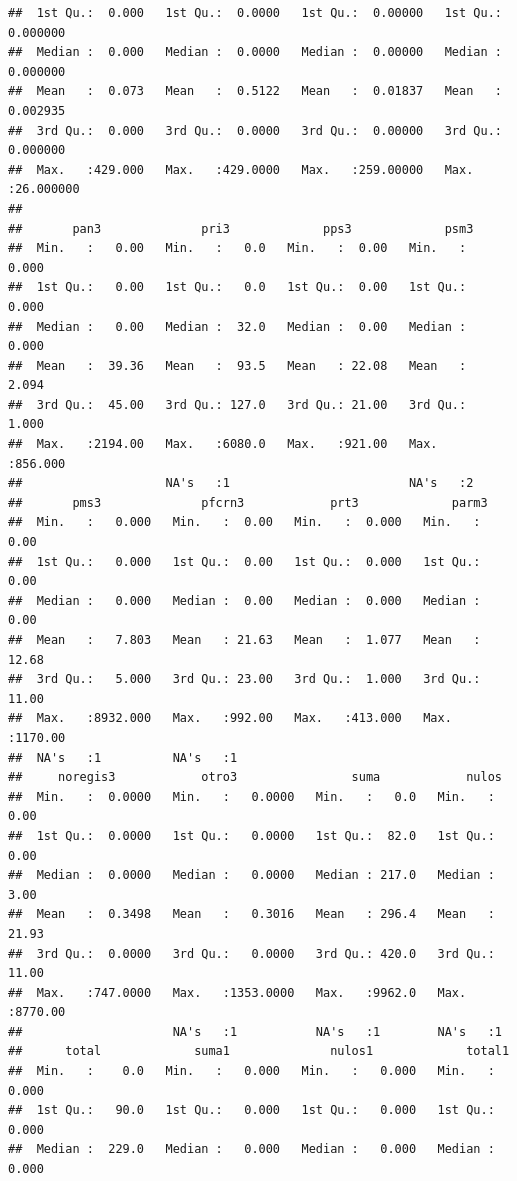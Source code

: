 \documentclass[
]{article}
\begin{document}
\begin{verbatim}
##  1st Qu.:  0.000   1st Qu.:  0.0000   1st Qu.:  0.00000   1st Qu.: 0.000000  
##  Median :  0.000   Median :  0.0000   Median :  0.00000   Median : 0.000000  
##  Mean   :  0.073   Mean   :  0.5122   Mean   :  0.01837   Mean   : 0.002935  
##  3rd Qu.:  0.000   3rd Qu.:  0.0000   3rd Qu.:  0.00000   3rd Qu.: 0.000000  
##  Max.   :429.000   Max.   :429.0000   Max.   :259.00000   Max.   :26.000000  
##                                                                              
##       pan3              pri3             pps3             psm3        
##  Min.   :   0.00   Min.   :   0.0   Min.   :  0.00   Min.   :  0.000  
##  1st Qu.:   0.00   1st Qu.:   0.0   1st Qu.:  0.00   1st Qu.:  0.000  
##  Median :   0.00   Median :  32.0   Median :  0.00   Median :  0.000  
##  Mean   :  39.36   Mean   :  93.5   Mean   : 22.08   Mean   :  2.094  
##  3rd Qu.:  45.00   3rd Qu.: 127.0   3rd Qu.: 21.00   3rd Qu.:  1.000  
##  Max.   :2194.00   Max.   :6080.0   Max.   :921.00   Max.   :856.000  
##                    NA's   :1                         NA's   :2        
##       pms3              pfcrn3            prt3             parm3        
##  Min.   :   0.000   Min.   :  0.00   Min.   :  0.000   Min.   :   0.00  
##  1st Qu.:   0.000   1st Qu.:  0.00   1st Qu.:  0.000   1st Qu.:   0.00  
##  Median :   0.000   Median :  0.00   Median :  0.000   Median :   0.00  
##  Mean   :   7.803   Mean   : 21.63   Mean   :  1.077   Mean   :  12.68  
##  3rd Qu.:   5.000   3rd Qu.: 23.00   3rd Qu.:  1.000   3rd Qu.:  11.00  
##  Max.   :8932.000   Max.   :992.00   Max.   :413.000   Max.   :1170.00  
##  NA's   :1          NA's   :1                                           
##     noregis3            otro3                suma            nulos        
##  Min.   :  0.0000   Min.   :   0.0000   Min.   :   0.0   Min.   :   0.00  
##  1st Qu.:  0.0000   1st Qu.:   0.0000   1st Qu.:  82.0   1st Qu.:   0.00  
##  Median :  0.0000   Median :   0.0000   Median : 217.0   Median :   3.00  
##  Mean   :  0.3498   Mean   :   0.3016   Mean   : 296.4   Mean   :  21.93  
##  3rd Qu.:  0.0000   3rd Qu.:   0.0000   3rd Qu.: 420.0   3rd Qu.:  11.00  
##  Max.   :747.0000   Max.   :1353.0000   Max.   :9962.0   Max.   :8770.00  
##                     NA's   :1           NA's   :1        NA's   :1        
##      total             suma1              nulos1             total1        
##  Min.   :    0.0   Min.   :   0.000   Min.   :   0.000   Min.   :   0.000  
##  1st Qu.:   90.0   1st Qu.:   0.000   1st Qu.:   0.000   1st Qu.:   0.000  
##  Median :  229.0   Median :   0.000   Median :   0.000   Median :   0.000  

\end{verbatim}
\end{document}
